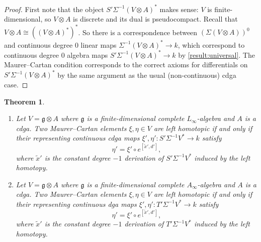 \documentclass[a4paper,reqno]{amsart}
\theoremstyle{plain}
\newtheorem{thm}{Theorem}[section]
\theoremstyle{definition}
\theoremstyle{remark}
\newcommand{\lie}[1]{\mathfrak{#1}}
\begin{document}
\begin{proof}
  First note that the object $S'\Sigma^{-1}(V \otimes A)^*$ makes sense: $V$ is finite-dimensional, so $V \otimes A$ is discrete and its dual is pseudocompact. 
  Recall that $V \otimes A \cong ((V \otimes A)^*)^*$. So there is a correspondence between $(\Sigma(V \otimes A))^0$ and continuous degree 0 linear maps $\Sigma^{-1}(V \otimes A)^* \to k$, which correspond to continuous degree 0 algebra maps $S'\Sigma^{-1}(V \otimes A)^* \to k$ by \cref{result:universal}.
  The Maurer--Cartan condition corresponds to the correct axioms for differentials on $S'\Sigma^{-1}(V \otimes A)^*$ by the same argument as the usual (non-continuous) cdga case.
\end{proof}

\begin{thm} \hfill
  \label{result:gauge_short_b}
  \begin{enumerate}
    \item Let\/ $V = \lie{g} \otimes A$ where $\lie{g}$ is a finite-dimensional complete $L_{\infty}$-algebra and $A$ is a cdga. 
      Two Maurer--Cartan elements\/ $\xi, \eta \in V$ are left homotopic if and only if their representing continuous cdga maps\/ $\xi', \eta' \colon S'\Sigma^{-1}V^* \to k$ satisfy
      \[
        \eta' = \xi' \circ e^{[\tilde{x}',d']},
      \]
      where $\tilde{x}'$ is the constant degree $-1$ derivation of\/ $S'\Sigma^{-1}V^*$ induced by the left homotopy.

    \item Let\/ $V = \lie{g} \otimes A$ where $\lie{g}$ is a finite-dimensional complete $A_{\infty}$-algebra and $A$ is a cdga. 
      Two Maurer--Cartan elements\/ $\xi, \eta \in V$ are left homotopic if and only if their representing continuous dga maps\/ $\xi', \eta' \colon T'\Sigma^{-1}V^* \to k$ satisfy
      \[
        \eta' = \xi' \circ e^{[\tilde{x}',d']},
      \]
      where $\tilde{x}'$ is the constant degree $-1$ derivation of\/ $T'\Sigma^{-1}V^*$ induced by the left homotopy.
  \end{enumerate}
\end{thm}
\end{document}

